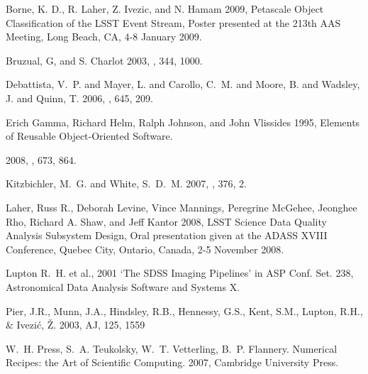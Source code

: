\begin{thebibliography}{}

 Borne, K. D., R. Laher, Z. Ivezic, and N. Hamam 2009,
   Petascale Object Classification of the LSST Event Stream, 
   Poster presented at the 213th AAS Meeting, Long Beach, CA, 4-8
   January 2009.

 Bruzual, G, and
  S. Charlot 2003, \mnras, 344, 1000.

  {{Debattista}, V.~P. and {Mayer}, L. and {Carollo}, C.~M. and  
    {Moore}, B. and {Wadsley}, J. and {Quinn}, T.} 2006, \apj, 645, 209.

Erich Gamma, Richard Helm, Ralph Johnson, and John Vlissides 1995,
Elements of Reusable Object-Oriented Software.

 2008,
  \apj, 673, 864.

  {{Kitzbichler}, M.~G. and {White}, S.~D.~M.} 2007, \mnras, 376, 2.

 Laher, Russ R., Deborah Levine, Vince Mannings, 
   Peregrine McGehee, Jeonghee Rho, Richard A. Shaw, and Jeff Kantor 2008,
   LSST Science Data Quality Analysis Subsystem Design,
   Oral presentation given at the ADASS XVIII Conference, Quebec City, Ontario, Canada, 
   2-5 November 2008.

Lupton R.~H. et al., 2001 `The SDSS Imaging Pipelines' in
ASP Conf. Set. 238, Astronomical Data Analysis Software and Systems X.
   
 Pier, J.R., Munn, J.A., Hindsley, R.B., Hennessy, G.S.,
Kent, S.M., Lupton, R.H., \& Ivezi\'c, \v{Z}. 2003, AJ, 125, 1559

  W.~H. Press,  S.~A. Teukolsky, W.~T. Vetterling, B.~P. Flannery.
  Numerical Recipes: the Art of Scientific Computing.
  2007, Cambridge University Press.
   
\end{thebibliography}
